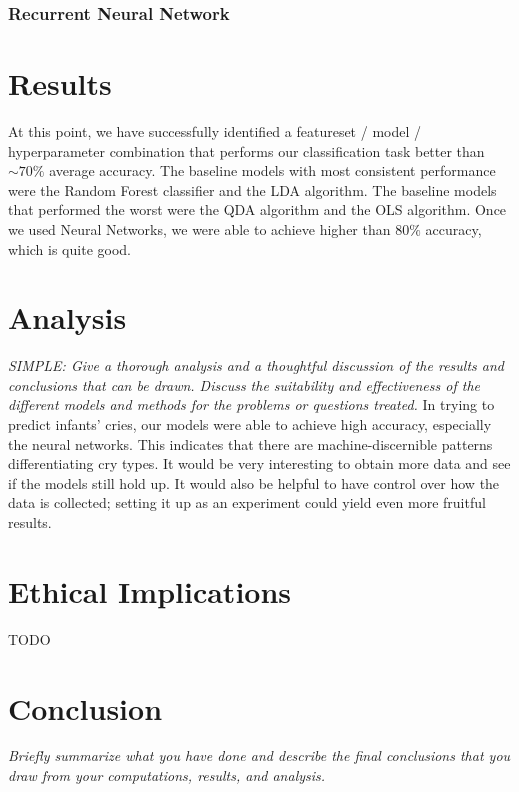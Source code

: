 \documentclass[11pt]{article}
\begin{document}
\subsubsection{Recurrent Neural Network}

\section{Results}
At this point, we have successfully identified a featureset / model / hyperparameter combination that performs our classification task better than $\sim70\%$ average accuracy.
The baseline models with most consistent performance were the Random Forest classifier and the LDA algorithm.
The baseline models that performed the worst were the QDA algorithm and the OLS algorithm.
Once we used Neural Networks, we were able to achieve higher than $ 80 \% $ accuracy, which is quite good.



\section{Analysis}
\textit{SIMPLE: Give a thorough analysis and a thoughtful discussion of the results and conclusions that can be drawn. Discuss the suitability and effectiveness of the different models and methods for the problems or questions treated.}
In trying to predict infants' cries, our models were able to achieve high accuracy, especially the neural networks.
This indicates that there are machine-discernible patterns differentiating cry types.
It would be very interesting to obtain more data and see if the models still hold up.
It would also be helpful to have control over how the data is collected; setting it up as an experiment could yield even more fruitful results.



\section{Ethical Implications}
TODO

\section{Conclusion}
\textit{Briefly summarize what you have done and describe the final conclusions that you draw from your computations, results, and analysis.}
\end{document}
